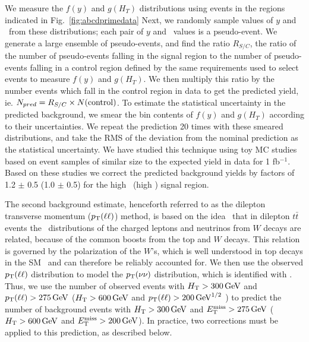 We measure the $f(y)$ and $g(H_T)$ distributions using events in the regions indicated in Fig.~\ref{fig:abcdprimedata}
Next, we randomly sample values of $y$ and \Ht\ from these distributions; each pair of $y$ and \Ht\ values is a pseudo-event.
We generate a large ensemble of pseudo-events, and find the ratio $R_{S/C}$, the ratio of the
number of pseudo-events falling in the signal region to the number of pseudo-events
falling in a control region defined by the same requirements used to select events
to measure $f(y)$ and $g(H_T)$. We then
multiply this ratio by the number events which fall in the control region in data
to get the predicted yield, ie. $N_{pred} = R_{S/C} \times N({\rm control})$. 
To estimate the statistical uncertainty in the predicted background, we smear the bin contents
of $f(y)$ and $g(H_T)$ according to their uncertainties. We repeat the prediction 20 times
with these smeared distributions, and take the RMS of the deviation from the nominal prediction
as the statistical uncertainty. We have studied this technique using toy MC studies based on
event samples of similar size to the expected yield in data for 1 fb$^{-1}$.
Based on these studies we correct the predicted background yields by factors of 1.2 $\pm$ 0.5
(1.0 $\pm$ 0.5) for the high \MET\ (high \Ht) signal region.


The second  background estimate, henceforth referred to as the dilepton transverse momentum ($p_{\mathrm{T}}(\ell\ell)$) method, 
is  based on the  idea~\cite{ref:victory} that  in dilepton  $t\bar{t}$  events the
\pt\  distributions of  the charged  leptons and  neutrinos  from $W$
decays are  related, because of the  common boosts from  the top  and $W$
decays.  This relation  is governed by the polarization  of the $W$'s,
which         is         well         understood        in         top
decays in the SM~\cite{Wpolarization,Wpolarization2}   and   can  therefore   be
reliably  accounted   for.   We then  use   the  observed
$p_{\mathrm{T}}(\ell\ell)$ distribution to  model the $p_{\mathrm{T}}(\nu\nu)$ distribution,
which is  identified with \MET.  Thus,  we use the  number of observed
events  with $H_{\mathrm{T}} > 300\,\text{Ge\hspace{-.08em}V}$ and $p_{\mathrm{T}}(\ell\ell)  > 275\,\text{Ge\hspace{-.08em}V}$ 
($H_{\mathrm{T}} > 600\,\text{Ge\hspace{-.08em}V}$ and $p_{\mathrm{T}}(\ell\ell)  > 200\,\text{Ge\hspace{-.08em}V}^{1/2}$ )
to predict the  number of  background events  with 
$H_{\mathrm{T}} >  300\,\text{Ge\hspace{-.08em}V}$ and  $E_{\mathrm{T}}^{\text{miss}} > 275\,\text{Ge\hspace{-.08em}V}$ ($H_{\mathrm{T}} >  600\,\text{Ge\hspace{-.08em}V}$ and  $E_{\mathrm{T}}^{\text{miss}} > 200\,\text{Ge\hspace{-.08em}V}$).  
In  practice, two corrections must be applied to this prediction, as described below.


